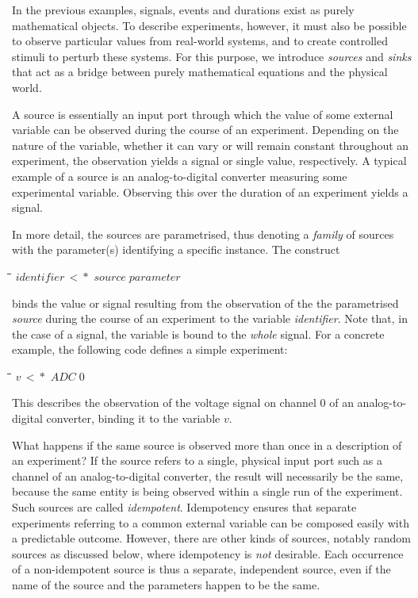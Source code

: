 \documentclass[11pt]{article}
\newlength{\lwidth}\setlength{\lwidth}{4.5cm}
\newlength{\cwidth}\setlength{\cwidth}{8mm} %
\newcommand{\Conid}[1]{\mathit{#1}}
\newcommand{\Varid}[1]{\mathit{#1}}
\begin{document}
In the previous examples, signals, events and durations exist as purely
mathematical objects. To describe experiments, however, it must also
be possible to observe particular values from real-world systems, and to
create controlled stimuli to perturb these systems. For this purpose, we
introduce \emph{sources} and \emph{sinks} that act as a bridge between 
purely mathematical equations and the physical world.

A source is essentially an input port through which the value of some external
variable can be observed during the course of an experiment. Depending on the
nature of the variable, whether it can vary or will remain constant throughout
an experiment, the observation yields a signal or single value, respectively.
A typical example of a source is an analog-to-digital converter measuring some
experimental variable. Observing this over the duration of an experiment
yields a signal.

In more detail, the sources are parametrised, thus denoting a \emph{family}
of sources with the parameter(s) identifying a specific instance. The
construct
\begin{tabbing}
\qquad\=\hspace{\lwidth}\=\hspace{\cwidth}\=\+\kill
${\Varid{identifier}\,<\!\!\!*\,\,\Varid{source}\;\Varid{parameter}}$
\end{tabbing}binds the value or signal resulting from the observation of the the
parametrised \emph{source} during the course of an experiment to the
variable \emph{identifier}. Note that, in the case of a signal, the
variable is bound to the \emph{whole} signal. For a concrete example,
the following code defines a simple experiment:
\begin{tabbing}
\qquad\=\hspace{\lwidth}\=\hspace{\cwidth}\=\+\kill
${\Varid{v}\,<\!\!\!*\,\,\Conid{ADC}\;\mathrm{0}}$
\end{tabbing}This describes the observation of the voltage signal on channel 0 of an
analog-to-digital converter, binding it to the variable \ensuremath{\Varid{v}}.

What happens if the same source is observed more than once in a description of
an experiment? If the source refers to a single, physical
input port such as a channel of an analog-to-digital converter, the result
will necessarily be the same, because the same entity is being observed within a
single run of the experiment. Such sources are called \emph{idempotent}.
Idempotency ensures that separate experiments referring to a common external
variable can be composed easily with a predictable outcome. However, there are
other kinds of sources, notably random sources as discussed below, where
idempotency is \emph{not} desirable. Each occurrence of a non-idempotent
source is thus a separate, independent source, even if the name of the
source and the parameters happen to be the same.
\end{document}
